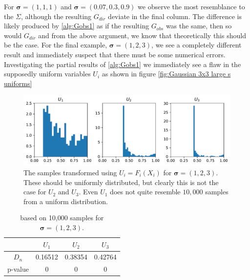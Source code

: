 \documentclass[../Thesis.tex]{subfiles}
\begin{document}
For $\boldsymbol\sigma = (1,1,1)$ and $\boldsymbol\sigma = (0.07, 0.3, 0.9)$ we observe the most resemblance to the $\Sigma$, although the resulting $G_{dir}$ deviate in the final column. The difference is likely produced by \autoref{alg:Gobs1} as if the resulting $G_{obs}$ was the same, then so would $G_{dir}$ and from the above argument, we know that theoretically this should be the case. For the final example, $\boldsymbol\sigma = (1,2,3)$, we see a completely different result and immediately suspect that there must be some numerical errors. Investigating the partial results of \autoref{alg:Gobs1} we immediately see a flaw in the supposedly uniform variables $U_i$ as shown in figure \autoref{fig:Gaussian 3x3 large s uniforms}
\begin{figure}[H]
    \centering
    \includegraphics[width=0.99\linewidth]{figures/ND examples/Gaussian 3x3 large s uniforms.pdf}
    \caption{The samples transformed using $U_i = F_i(X_i)$ for $\boldsymbol\sigma = (1,2,3)$. These should be uniformly distributed, but clearly this is not the case for $U_2$ and $U_3$. Even $U_1$ does not quite resemble $10{,}000$ samples from a uniform distribution.}
    \label{fig:Gaussian 3x3 large s uniforms}
\end{figure}
\begin{table}[ht]
    \centering
    \begin{tabular}{c|c|c|c}
                & $U_1$   & $U_2$   & $U_3$   \\\hline
        $D_n$   & 0.16512 & 0.38354 & 0.42764 \\
        p-value & 0       & 0       & 0
    \end{tabular}
    \caption{based on 10,000 samples for $\boldsymbol\sigma = (1, 2, 3)$.}
\end{table}



\end{document}
